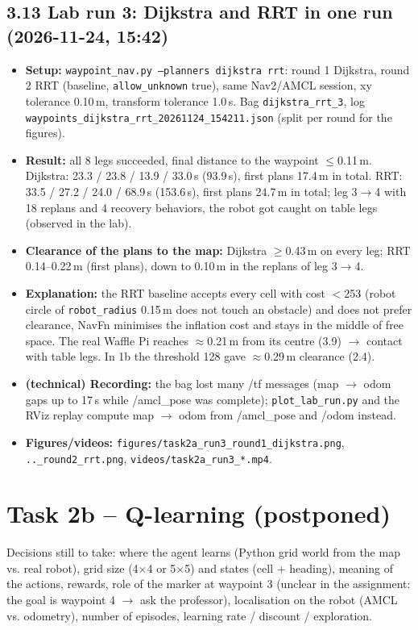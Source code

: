\documentclass[10pt]{article}
\newcommand{\pkg}[1]{\texttt{#1}}
\begin{document}
\subsection*{3.13 Lab run 3: Dijkstra and RRT in one run (2026-11-24, 15:42)}
\begin{itemize}
  \item \textbf{Setup:} \pkg{waypoint\_nav.py --planners dijkstra rrt}: round 1 Dijkstra, round 2 RRT (baseline, \pkg{allow\_unknown} true), same Nav2/AMCL session, xy tolerance 0.10\,m, transform tolerance 1.0\,s. Bag \pkg{dijkstra\_rrt\_3}, log \pkg{waypoints\_dijkstra\_rrt\_20261124\_154211.json} (split per round for the figures).
  \item \textbf{Result:} all 8 legs succeeded, final distance to the waypoint $\leq$0.11\,m. Dijkstra: 23.3 / 23.8 / 13.9 / 33.0\,s (93.9\,s), first plans 17.4\,m in total. RRT: 33.5 / 27.2 / 24.0 / 68.9\,s (153.6\,s), first plans 24.7\,m in total; leg 3$\rightarrow$4 with 18 replans and 4 recovery behaviors, the robot got caught on table legs (observed in the lab).
  \item \textbf{Clearance of the plans to the map:} Dijkstra $\geq$0.43\,m on every leg; RRT 0.14--0.22\,m (first plans), down to 0.10\,m in the replans of leg 3$\rightarrow$4.
  \item \textbf{Explanation:} the RRT baseline accepts every cell with cost $<$253 (robot circle of \pkg{robot\_radius} 0.15\,m does not touch an obstacle) and does not prefer clearance, NavFn minimises the inflation cost and stays in the middle of free space. The real Waffle Pi reaches $\approx$0.21\,m from its centre (3.9) $\rightarrow$ contact with table legs. In 1b the threshold 128 gave $\approx$0.29\,m clearance (2.4).
  \item \textbf{(technical) Recording:} the bag lost many /tf messages (map $\rightarrow$ odom gaps up to 17\,s while /amcl\_pose was complete); \pkg{plot\_lab\_run.py} and the RViz replay compute map $\rightarrow$ odom from /amcl\_pose and /odom instead.
  \item \textbf{Figures/videos:} \pkg{figures/task2a\_run3\_round1\_dijkstra.png}, \pkg{..\_round2\_rrt.png}, \pkg{videos/task2a\_run3\_*.mp4}.
\end{itemize}

\section{Task 2b -- Q-learning (postponed)}

Decisions still to take: where the agent learns (Python grid world from the map vs. real robot),
grid size (4$\times$4 or 5$\times$5) and states (cell + heading), meaning of the actions, rewards, role of the
marker at waypoint 3 (unclear in the assignment: the goal is waypoint 4 $\rightarrow$ ask the professor),
localisation on the robot (AMCL vs. odometry), number of episodes, learning rate / discount /
exploration.
\end{document}
